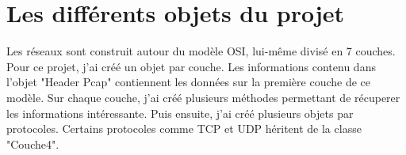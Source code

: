 \section{Les différents objets du projet}

Les réseaux sont construit autour du modèle OSI, lui-même divisé en 7 couches.
Pour ce projet, j'ai créé un objet par couche. Les informations contenu dans l'objet "Header Pcap" contiennent les données sur la première couche de ce modèle.
Sur chaque couche, j'ai créé plusieurs méthodes permettant de récuperer les informations intéressante.
Puis ensuite, j'ai créé plusieurs objets par protocoles. Certains protocoles comme TCP et UDP héritent de la classe "Couche4".
        

%
%
%
%
%
%
%
%
%
%
%
%
%
%
%
%
